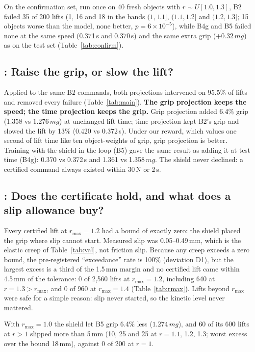  On the confirmation set, run once on 40 fresh objects with $r\sim U[1.0,1.3]$, B2 failed
35 of 200 lifts (1, 16 and 18 in the bands $(1,1.1]$, $(1.1,1.2]$ and $(1.2,1.3]$; 15 objects worse than the model, none
better, $p=6\times10^{-5}$), while B4g and B5 failed none at the same speed (0.371\,s and 0.370\,s) and the same extra grip
($+0.32\,mg$) as on the test set (Table~\ref{tab:confirm}).


\subsection{: Raise the grip, or slow the lift?}
Applied to the same B2 commands, both projections intervened on 95.5\% of lifts and removed every failure
(Table~\ref{tab:main}). \textbf{The grip projection keeps the speed; the time projection keeps the grip.} Grip projection
added 6.4\% grip ($1.358$ vs $1.276\,mg$) at unchanged lift time; time projection kept B2's grip and slowed the lift by
13\% (0.420 vs 0.372\,s). Under our reward, which values one second of lift time like ten object-weights of grip, grip
projection is better. Training with the shield in the loop (B5) gave the same result as adding it at test time (B4g):
0.370 vs 0.372\,s and 1.361 vs 1.358\,$mg$. The shield never declined: a certified command always existed within
30\,N or 2\,s.

\subsection{: Does the certificate hold, and what does a slip allowance buy?}\label{sec:q4}


 Every certified lift at $r_{\max}=1.2$ had a bound of exactly
zero: the shield placed the grip where slip cannot start. Measured slip was 0.05--0.49\,mm, which is the elastic creep of
Table~\ref{tab:val}, not friction slip. Because any creep exceeds a zero bound, the pre-registered ``exceedance'' rate is
100\% (deviation D1), but the largest excess is a third of the 1.5\,mm margin and no certified lift came within 4.5\,mm of
the tolerance: 0 of 2{,}560 lifts at $r_{\max}=1.2$, including 640 at $r=1.3>r_{\max}$, and 0 of 960 at $r_{\max}=1.4$
(Table~\ref{tab:rmax}). Lifts beyond $r_{\max}$ were safe for a simple reason: slip never started, so the kinetic level never
mattered.

 With $r_{\max}=1.0$ the shield let B5 grip 6.4\% less
($1.274\,mg$), and 60 of its 600 lifts at $r>1$ slipped more than 5\,mm (10, 25 and 25 at $r=1.1$, 1.2, 1.3; worst excess
over the bound 18\,mm), against 0 of 200 at $r=1$.

